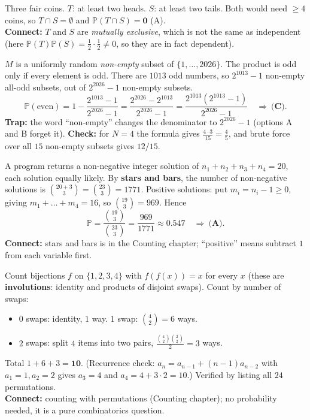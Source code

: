 \documentclass[11pt,a4paper]{article}
\renewcommand{\Pr}{\mathbb{P}}
\begin{document}
\begin{example}
Three fair coins. $T$: at least two heads. $S$: at least two tails. Both would need $\ge4$ coins, so $T\cap S=\emptyset$ and $\Pr(T\cap S)=\mathbf0$ \quad (A).\\
\textbf{Connect:} $T$ and $S$ are \emph{mutually exclusive}, which is not the same as independent (here $\Pr(T)\Pr(S)=\tfrac12\cdot\tfrac12\neq0$, so they are in fact dependent).
\end{example}

\begin{example}
$M$ is a uniformly random \emph{non-empty} subset of $\{1,\dots,2026\}$. The product is odd only if every element is odd. There are $1013$ odd numbers, so $2^{1013}-1$ non-empty all-odd subsets, out of $2^{2026}-1$ non-empty subsets.
\[\Pr(\text{even})=1-\frac{2^{1013}-1}{2^{2026}-1}=\frac{2^{2026}-2^{1013}}{2^{2026}-1}=\frac{2^{1013}(2^{1013}-1)}{2^{2026}-1}\quad\Rightarrow\ \textbf{(C)}.\]
\textbf{Trap:} the word ``non-empty'' changes the denominator to $2^{2026}-1$ (options A and B forget it). \textbf{Check:} for $N=4$ the formula gives $\frac{4\cdot3}{15}=\frac45$, and brute force over all $15$ non-empty subsets gives $12/15$.
\end{example}

\begin{example}
A program returns a non-negative integer solution of $n_1+n_2+n_3+n_4=20$, each solution equally likely. By \textbf{stars and bars}, the number of non-negative solutions is $\binom{20+3}{3}=\binom{23}{3}=1771$. Positive solutions: put $m_i=n_i-1\ge0$, giving $m_1+\dots+m_4=16$, so $\binom{19}{3}=969$. Hence
\[\Pr=\frac{\binom{19}{3}}{\binom{23}{3}}=\frac{969}{1771}\approx0.547\quad\Rightarrow\ \textbf{(A)}.\]
\textbf{Connect:} stars and bars is in the Counting chapter; ``positive'' means subtract $1$ from each variable first.
\end{example}

\begin{example}
Count bijections $f$ on $\{1,2,3,4\}$ with $f(f(x))=x$ for every $x$ (these are \textbf{involutions}: identity and products of disjoint swaps). Count by number of swaps:
\begin{itemize}[noitemsep]
\item $0$ swaps: identity, $1$ way. \quad $1$ swap: $\binom42=6$ ways.
\item $2$ swaps: split $4$ items into two pairs, $\frac{\binom42\binom22}{2}=3$ ways.
\end{itemize}
Total $1+6+3=\mathbf{10}$. (Recurrence check: $a_n=a_{n-1}+(n-1)a_{n-2}$ with $a_1=1,a_2=2$ gives $a_3=4$ and $a_4=4+3\cdot2=10$.) Verified by listing all $24$ permutations.\\
\textbf{Connect:} counting with permutations (Counting chapter); no probability needed, it is a pure combinatorics question.
\end{example}
\end{document}

